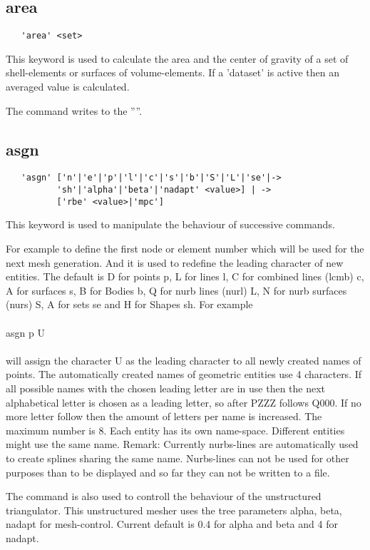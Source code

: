 \documentclass{article}
\begin{document}
\subsection{\label{area}area}
\begin{verbatim}
   'area' <set> 
\end{verbatim}
This keyword is used to calculate the area and the center of gravity of a set of shell-elements or surfaces of volume-elements. If a 'dataset' is active then an averaged value is calculated.

The command writes to the ''''.

\subsection{\label{asgn}asgn}
\begin{verbatim}
   'asgn' ['n'|'e'|'p'|'l'|'c'|'s'|'b'|'S'|'L'|'se'|->
          'sh'|'alpha'|'beta'|'nadapt' <value>] | ->
          ['rbe' <value>|'mpc']
\end{verbatim}
This keyword is used to manipulate the behaviour of successive commands.

For example to define the first node or element number which will be used for the next mesh generation. And it is used to redefine the leading character of new entities. The default is D for points p, L for lines l, C for combined lines (lcmb) c, A for surfaces s, B for Bodies b, Q for nurb lines (nurl) L, N for nurb surfaces (nurs) S, A for sets se and H for Shapes sh. For example\\\\asgn p U\\\\will assign the character U as the leading character to all newly created names of points. The automatically created names of geometric entities use 4 characters. If all possible names with the chosen leading letter are in use then the next alphabetical letter is chosen as a leading letter, so after PZZZ follows Q000. If no more letter follow then the amount of letters per name is increased. The maximum number is 8. Each entity has its own name-space. Different entities might use the same name. Remark: Currently nurbs-lines are automatically used to create splines sharing the same name. Nurbs-lines can not be used for other purposes than to be displayed and so far they can not be written to a file.

The command is also used to controll the behaviour of the unstructured triangulator. This unstructured mesher \cite{mesh2d} uses the tree parameters alpha, beta, nadapt for mesh-control. Current default is 0.4 for alpha and beta and 4 for nadapt.
\end{document}
